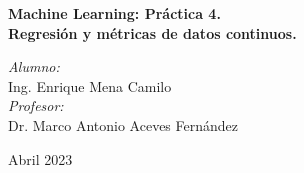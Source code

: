 
\begin{titlepage}

\vspace*{10cm}
{\huge \bfseries \textcolor{RojoUAQ}{Machine Learning: Práctica 4.\\ Regresión y métricas de datos continuos.}}

\vspace*{1cm}

\begin{center}
	\noindent
	\begin{minipage}{0.4\textwidth}
	\begin{flushleft} \large
	\end{flushleft}
	\end{minipage}	
	\begin{minipage}{0.5\textwidth}
	\begin{flushright} \large
	\emph{Alumno:} \\
	Ing. Enrique Mena Camilo \\[1.5cm]
	\emph{Profesor:} \\
	Dr. Marco Antonio Aceves Fernández
	\end{flushright}
	\end{minipage}
	\vfill
	{\large Abril 2023}
\end{center}
\end{titlepage}
